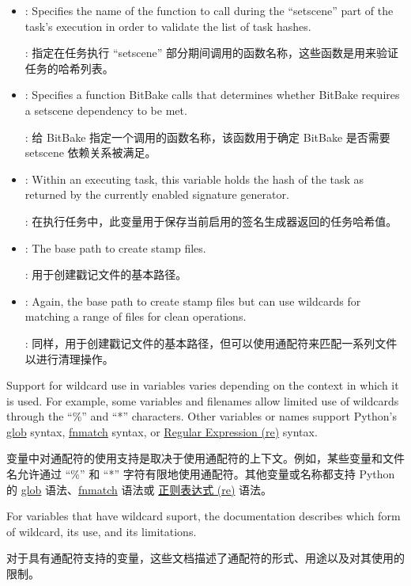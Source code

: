 \begin{itemize}
\setlength\itemsep{1.0em}
\item {}: Specifies the name of the function to call during the ``setscene'' part of the task's execution in order to validate the list of task hashes.

\medskip
{}: 指定在任务执行 ``setscene'' 部分期间调用的函数名称，这些函数是用来验证任务的哈希列表。

\item {}: Specifies a function BitBake calls that determines whether BitBake requires a setscene dependency to be met.

\medskip
{}: 给 BitBake 指定一个调用的函数名称，该函数用于确定 BitBake 是否需要 setscene 依赖关系被满足。

\item {}: Within an executing task, this variable holds the hash of the task as returned by the currently enabled signature generator.

\medskip
{}: 在执行任务中，此变量用于保存当前启用的签名生成器返回的任务哈希值。

\item {}: The base path to create stamp files.

\medskip
{}: 用于创建戳记文件的基本路径。

\item {}: Again, the base path to create stamp files but can use wildcards for matching a range of files for clean operations.

\medskip
{}: 同样，用于创建戳记文件的基本路径，但可以使用通配符来匹配一系列文件以进行清理操作。
\end{itemize}


Support for wildcard use in variables varies depending on the context in which it is used. For example, some variables and filenames allow limited use of wildcards through the ``\%'' and ``*'' characters. Other variables or names support Python's \href{https://docs.python.org/3/library/glob.html}{glob} syntax, \href{https://docs.python.org/3/library/fnmatch.html#module-fnmatch}{fnmatch} syntax, or \href{https://docs.python.org/3/library/re.html}{Regular Expression (re)} syntax.

变量中对通配符的使用支持是取决于使用通配符的上下文。例如，某些变量和文件名允许通过 ``\%'' 和 ``*'' 字符有限地使用通配符。其他变量或名称都支持 Python 的 \href{https://docs.python.org/3/library/glob.html}{glob} 语法、\href{https://docs.python.org/3/library/fnmatch.html#module-fnmatch}{fnmatch} 语法或 \href{https://docs.python.org/3/library/re.html}{正则表达式 (re)} 语法。

For variables that have wildcard suport, the documentation describes which form of wildcard, its use, and its limitations.

对于具有通配符支持的变量，这些文档描述了通配符的形式、用途以及对其使用的限制。
